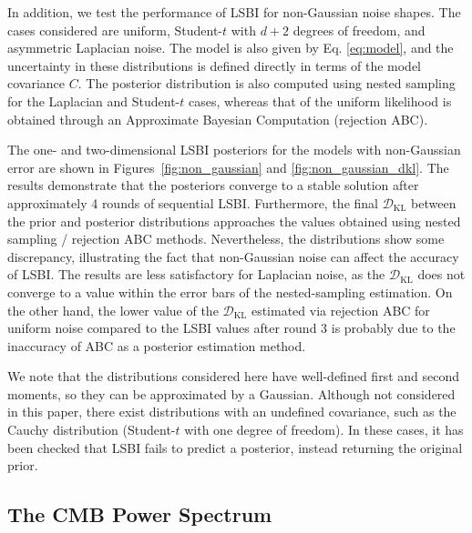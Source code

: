 \documentclass[%
 reprint,
 amsmath,amssymb,
 aps,
]{revtex4-2}
\begin{document}
In addition, we test the performance of LSBI for non-Gaussian noise shapes. The cases considered are uniform, Student-$t$ with $d+2$ degrees of freedom, and asymmetric Laplacian noise. The model is also given by Eq. \ref{eq:model}, and the uncertainty in these distributions is defined directly in terms of the model covariance $C$.  The posterior distribution is also computed using nested sampling for the Laplacian and Student-$t$ cases, whereas that of the uniform likelihood is obtained through an Approximate Bayesian Computation (rejection ABC).

The one- and two-dimensional LSBI posteriors for the models with non-Gaussian error are shown in Figures~\ref{fig:non_gaussian} and \ref{fig:non_gaussian_dkl}. The results demonstrate that the posteriors converge to a stable solution after approximately 4 rounds of sequential LSBI. Furthermore, the final $\mathcal{D}_\mathrm{KL}$ between the prior and posterior distributions approaches the values obtained using nested sampling / rejection ABC methods. Nevertheless, the distributions show some discrepancy, illustrating the fact that non-Gaussian noise can affect the accuracy of LSBI. The results are less satisfactory for Laplacian noise, as the $\mathcal{D}_\mathrm{KL}$ does not converge to a value within the error bars of the nested-sampling estimation. On the other hand, the lower value of the $\mathcal{D}_\mathrm{KL}$ estimated via rejection ABC for uniform noise compared to the LSBI values after round 3 is probably due to the inaccuracy of ABC as a posterior estimation method.

We note that the distributions considered here have well-defined first and second moments, so they can be approximated by a Gaussian. Although not considered in this paper, there exist distributions with an undefined covariance, such as the Cauchy distribution (Student-$t$ with one degree of freedom). In these cases, it has been checked that LSBI fails to predict a posterior, instead returning the original prior.



\subsection{The CMB Power Spectrum } \label{sec:results}
\end{document}
